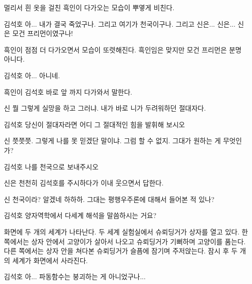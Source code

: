 \documentclass{screenplay}
\begin{document}
    멀리서 흰 옷을 걸친 흑인이 다가오는 모습이 뿌옇게 비친다.
    \begin{dialogue}{김석호}
        아... 내가 결국 죽었구나. 그리고 여기가 천국이구나. 그리고 신은... 신은...
        신은 모건 프리먼이였구나!
    \end{dialogue}
    
    흑인이 점점 더 다가오면서 모습이 또렷해진다. 흑인임은 맞지만 모건 프리먼은 분명 아니다.
    
    \begin{dialogue}[크게 실망하며]{김석호}
        아... 아니네.
    \end{dialogue}
    
    흑인이 김석호 바로 앞 까지 다가와서 말한다.
    \begin{dialogue}{신}
        뭘 그렇게 실망을 하고 그러냐. 내가 바로 니가 두려워하던 절대자다.
    \end{dialogue}
    \begin{dialogue}{김석호}
        당신이 절대자라면 어디 그 절대적인 힘을 발휘해 보시오
    \end{dialogue}
    \begin{dialogue}{신}
        쯧쯧쯧. 그렇게 나를 못 믿겠단 말이냐. 그럼 할 수 없지. 그대가 원하는 게 무엇인가?
    \end{dialogue}
    \begin{dialogue}[잠시 고민하다가]{김석호}
        나를 천국으로 보내주시오
    \end{dialogue}
    
    신은 천천히 김석호를 주시하다가 이내 웃으면서 답한다.
    
    \begin{dialogue}{신}
        천국이라? 알겠네 하하하. 그대는 평행우주론에 대해서 들어본 적 있나?
    \end{dialogue}
    
    \begin{dialogue}{김석호}
        양자역학에서 다세계 해석을 말씀하시는 거요?
    \end{dialogue}
    
    화면에 두 개의 세계가 나타난다. 두 세계 실험실에서 슈뢰딩거가 상자를 열고 있다. 한쪽에서는 상자 안에서 고양이가 살아서 나오고 슈뢰딩거가 기뻐하며 고양이를 품는다. 다른 쪽에서는 상자 안을 쳐다본 슈뢰딩거가 슬픔에 잠기며 주저앉는다. 잠시 후 두 개의 세계가 화면에서 사라진다.
    
    \begin{dialogue}{김석호}
        아... 파동함수는 붕괴하는 게 아니었구나...
    \end{dialogue}
    
\end{document}
